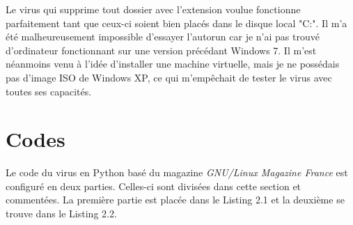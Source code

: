 \medskip

Le virus qui supprime tout dossier avec l'extension voulue fonctionne parfaitement tant que ceux-ci soient bien placés dans le disque local "C:". Il m'a été malheureusement impossible d'essayer l'autorun car je n'ai pas trouvé d'ordinateur fonctionnant sur une version précédant Windows 7. Il m'est néanmoins venu à l'idée d'installer une machine virtuelle, mais je ne possédais pas d'image ISO de Windows XP, ce qui m'empêchait de tester le virus avec toutes ses capacités.   


\section{Codes}

Le code du virus en Python basé du magazine \textit{GNU/Linux Magazine France} est configuré en deux parties. Celles-ci sont divisées dans cette section et commentées. La première partie est placée dans le Listing 2.1 et la deuxième se trouve dans le Listing 2.2.

